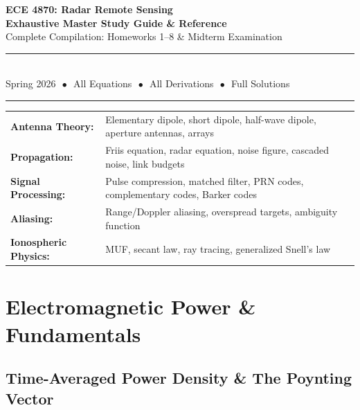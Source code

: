 \documentclass[10pt,letterpaper]{article}
\begin{document}
\begin{titlepage}
\pagecolor{darkblue}
\color{white}
\vspace*{2cm}
\begin{center}
{\Huge\bfseries ECE 4870: Radar Remote Sensing}\\[0.5cm]
{\LARGE\bfseries Exhaustive Master Study Guide \& Reference}\\[0.3cm]
{\large Complete Compilation: Homeworks 1--8 \& Midterm Examination}\\[0.5cm]
\rule{0.8\textwidth}{1pt}\\[0.3cm]
{\large Spring 2026 $\,\bullet\,$ All Equations $\,\bullet\,$ All Derivations $\,\bullet\,$ Full Solutions}\\[0.3cm]
\rule{0.8\textwidth}{1pt}
\end{center}
\vfill
\begin{center}
\begin{tabular}{ll}
\textbf{Antenna Theory:} & Elementary dipole, short dipole, half-wave dipole, aperture antennas, arrays \\
\textbf{Propagation:} & Friis equation, radar equation, noise figure, cascaded noise, link budgets \\
\textbf{Signal Processing:} & Pulse compression, matched filter, PRN codes, complementary codes, Barker codes \\
\textbf{Aliasing:} & Range/Doppler aliasing, overspread targets, ambiguity function \\
\textbf{Ionospheric Physics:} & MUF, secant law, ray tracing, generalized Snell's law \\
\end{tabular}
\end{center}
\vspace{1cm}
\end{titlepage}
\pagecolor{white}
\color{black}

\tableofcontents
\newpage

\section{Electromagnetic Power \& Fundamentals}

\subsection{Time-Averaged Power Density \& The Poynting Vector}
\end{document}
